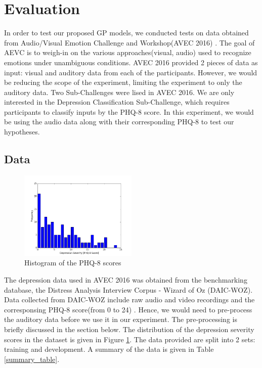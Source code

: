 \documentclass{article}
\begin{document}
	\section{Evaluation}
	In order to test our proposed GP models, we conducted tests on data obtained from Audio/Visual Emotion Challenge and Workshop(AVEC 2016) \cite{avec2016}. 
	The goal of AEVC is to weigh-in on the various approaches(visual, audio) used to recognize emotions under unambiguous conditions. 
	AVEC 2016 provided 2 pieces of data as input: visual and auditory data from each of the participants. 
	However, we would be reducing the scope of the experiment, limiting the experiment to only the auditory data. Two Sub-Challenges were lised in AVEC 2016. 
	We are only interested in the Depression Classification Sub-Challenge, which requires participants to classify inputs by the PHQ-8 score. 
	In this experiment, we would be using the audio data along with their corresponding PHQ-8 to test our hypotheses.

	\subsection{Data}
	\begin{figure}[h]
	\center
 	\includegraphics[width=0.5\textwidth]{histogram_phq8}
	\caption{Histogram of the PHQ-8 scores}
	\label{histogram_phq8}
	\end{figure}
	
	The depression data used in AVEC 2016 was obtained from the benchmarking database, the Distress Analysis Interview Corpus - Wizard of Oz (DAIC-WOZ). 
	Data collected from DAIC-WOZ include raw audio and video recordings and the corresponsing PHQ-8 score(from 0 to 24) \cite{jad2008}. Hence, we would 
	need to pre-process the auditory data before we use it in our experiment. The pre-processing is briefly discussed in the section below.
	The distribution of the depression severity scores in the dataset is given in Figure \ref{histogram_phq8}. 
	The data provided are split into 2 sets: training and development.
	A summary of the data is given in Table \ref{summary_table}.
\end{document}
